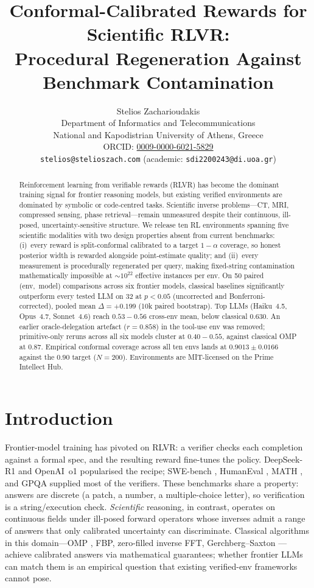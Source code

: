 \documentclass{article}
\title{Conformal-Calibrated Rewards for Scientific {RLVR}:\\
       Procedural Regeneration Against Benchmark Contamination}
\author{%
  Stelios Zacharioudakis\\
  Department of Informatics and Telecommunications\\
  National and Kapodistrian University of Athens, Greece\\
  ORCID: \href{https://orcid.org/0009-0000-6021-5829}{0009-0000-6021-5829}\\
  \texttt{stelios@stelioszach.com} \quad (academic: \texttt{sdi2200243@di.uoa.gr})
}
\begin{document}
\maketitle

\begin{abstract}
Reinforcement learning from verifiable rewards (RLVR) has become the
dominant training signal for frontier reasoning models, but existing
verified environments are dominated by symbolic or code-centred tasks.
Scientific inverse problems---CT, MRI, compressed sensing, phase
retrieval---remain unmeasured despite their continuous, ill-posed,
uncertainty-sensitive structure. We release ten RL environments
spanning five scientific modalities with two design properties absent
from current benchmarks: (i)~every reward is split-conformal calibrated
to a target $1{-}\alpha$ coverage, so honest posterior width is
rewarded alongside point-estimate quality; and (ii)~every measurement
is procedurally regenerated per query, making fixed-string
contamination mathematically impossible at $\sim\!10^{22}$ effective
instances per env. On 50 paired (env,~model) comparisons across six
frontier models, classical baselines significantly outperform every
tested LLM on 32 at $p{<}0.05$ (uncorrected and Bonferroni-corrected),
pooled mean $\Delta{=}{+}0.199$ (10k paired bootstrap). Top LLMs
(Haiku~4.5, Opus~4.7, Sonnet~4.6) reach $0.53{-}0.56$ cross-env mean,
below classical $0.630$. An earlier oracle-delegation artefact
($r{=}0.858$) in the tool-use env was removed; primitive-only reruns
across all six models cluster at $0.40{-}0.55$, against classical OMP
at $0.87$. Empirical conformal coverage across all ten envs lands at
$0.9013{\pm}0.0166$ against the $0.90$ target ($N{=}200$).
Environments are MIT-licensed on the Prime Intellect Hub.
\end{abstract}

\vspace{-4pt}
\section{Introduction}
\vspace{-2pt}

Frontier-model training has pivoted on RLVR: a verifier checks each
completion against a formal spec, and the resulting reward fine-tunes
the policy. DeepSeek-R1 \citep{deepseek2025r1} and OpenAI~o1
\citep{openai2024o1} popularised the recipe;
SWE-bench \citep{jimenez2024swebench}, HumanEval
\citep{chen2021humaneval}, MATH \citep{hendrycks2021math}, and
GPQA \citep{rein2023gpqa} supplied most of the verifiers. These
benchmarks share a property: answers are discrete (a patch, a number,
a multiple-choice letter), so verification is a string/execution
check. \emph{Scientific} reasoning, in contrast, operates on
continuous fields under ill-posed forward operators whose inverses
admit a range of answers that only calibrated uncertainty can
discriminate. Classical algorithms in this domain---OMP
\citep{tropp2007signal, donoho2006compressed, candes2006near}, FBP,
zero-filled inverse FFT,
Gerchberg--Saxton
\citep{gerchberg1972practical}---achieve calibrated answers via
mathematical guarantees; whether frontier LLMs can match them is an
empirical question that existing verified-env frameworks cannot pose.
\end{document}
